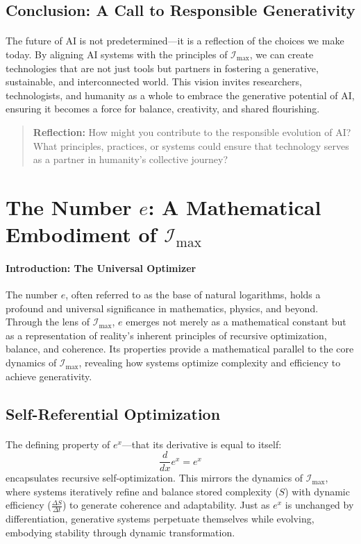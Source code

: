 \documentclass[12pt]{article}
\begin{document}
\subsection{Conclusion: A Call to Responsible Generativity}
\paragraph{}
The future of AI is not predetermined—it is a reflection of the choices we make today. By aligning AI systems with the principles of \(\mathcal{I}_{\text{max}}\), we can create technologies that are not just tools but partners in fostering a generative, sustainable, and interconnected world. This vision invites researchers, technologists, and humanity as a whole to embrace the generative potential of AI, ensuring it becomes a force for balance, creativity, and shared flourishing.

\begin{quote}
\textbf{Reflection:}  
How might you contribute to the responsible evolution of AI? What principles, practices, or systems could ensure that technology serves as a partner in humanity’s collective journey?
\end{quote}


\section{The Number \(e\): A Mathematical Embodiment of \(\mathcal{I}_{\text{max}}\)}

\paragraph{Introduction: The Universal Optimizer}
The number \(e\), often referred to as the base of natural logarithms, holds a profound and universal significance in mathematics, physics, and beyond. Through the lens of \(\mathcal{I}_{\text{max}}\), \(e\) emerges not merely as a mathematical constant but as a representation of reality's inherent principles of recursive optimization, balance, and coherence. Its properties provide a mathematical parallel to the core dynamics of \(\mathcal{I}_{\text{max}}\), revealing how systems optimize complexity and efficiency to achieve generativity.

\subsection{Self-Referential Optimization}
\paragraph{}
The defining property of \(e^x\)—that its derivative is equal to itself:
\[
\frac{d}{dx} e^x = e^x
\]
encapsulates recursive self-optimization. This mirrors the dynamics of \(\mathcal{I}_{\text{max}}\), where systems iteratively refine and balance stored complexity (\(S\)) with dynamic efficiency (\(\frac{\Delta S}{\Delta t}\)) to generate coherence and adaptability. Just as \(e^x\) is unchanged by differentiation, generative systems perpetuate themselves while evolving, embodying stability through dynamic transformation.
\end{document}
